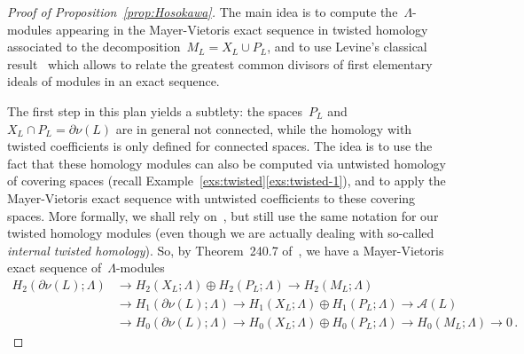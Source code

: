 \documentclass{amsart}
\newcommand{\A}{\mathcal{A}}
\theoremstyle{definition}
\theoremstyle{remark}
\begin{document}
	\begin{proof}[Proof of Proposition~\ref{prop:Hosokawa}]
	The main idea is to compute the~$\Lambda$-modules appearing in the Mayer-Vietoris exact sequence in twisted homology associated to the decomposition~$M_L=X_L\cup P_L$, and to use Levine's classical result~\cite[Lemma~5]{Lev67} which allows to relate the greatest common divisors of first elementary ideals of modules
	in an exact sequence.
	
	The first step in this plan yields a subtlety: the spaces~$P_L$ and~$X_L\cap P_L=\partial\nu(L)$ are in general not connected,
	while the homology with twisted coefficients is only defined for connected spaces. The idea is to use the fact that these homology modules can also be computed via untwisted homology of covering spaces (recall Example~\ref{exs:twisted}\ref{exs:twisted-1}), and to apply the Mayer-Vietoris exact sequence with untwisted coefficients to these covering spaces. 
	More formally, we shall rely on~\cite[Chapter~240]{Friedl}, but still use the same notation for our twisted homology modules (even though we are actually dealing with so-called {\em internal twisted homology\/}). So, by Theorem~240.7 of~\cite{Friedl}, we have a Mayer-Vietoris exact sequence of~$\Lambda$-modules
	\begin{equation}
  \label{eq:MV}
  \begin{aligned}
	H_2(\partial\nu(L);\Lambda)&\longrightarrow H_2(X_L;\Lambda)\oplus H_2(P_L;\Lambda)\longrightarrow H_2(M_L;\Lambda)\\
	&\longrightarrow H_1(\partial\nu(L);\Lambda)\longrightarrow H_1(X_L;\Lambda)\oplus H_1(P_L;\Lambda)\longrightarrow \A(L)\\
	&\longrightarrow H_0(\partial\nu(L);\Lambda)\longrightarrow H_0(X_L;\Lambda)\oplus H_0(P_L;\Lambda)\longrightarrow H_0(M_L;\Lambda)\longrightarrow 0\,.
	\end{aligned}
	\end{equation}
	

\end{proof}
\end{document}
